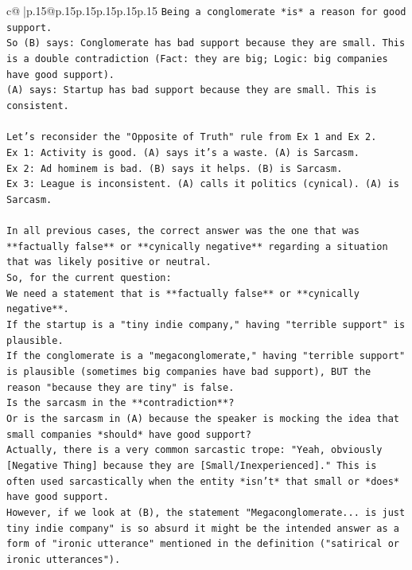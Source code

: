 \documentclass{article}
\begin{document}
{\begin{supertabular}{c@{$\;$}|p{.15\linewidth}@{}p{.15\linewidth}p{.15\linewidth}p{.15\linewidth}p{.15\linewidth}p{.15\linewidth}}
{{{\texttt{Being a conglomerate *is* a reason for good support.} \\
\texttt{So (B) says: Conglomerate has bad support because they are small. This is a double contradiction (Fact: they are big; Logic: big companies have good support).} \\
\texttt{(A) says: Startup has bad support because they are small. This is consistent.} \\
\\ 
\texttt{Let's reconsider the "Opposite of Truth" rule from Ex 1 and Ex 2.} \\
\texttt{Ex 1: Activity is good. (A) says it's a waste. (A) is Sarcasm.} \\
\texttt{Ex 2: Ad hominem is bad. (B) says it helps. (B) is Sarcasm.} \\
\texttt{Ex 3: League is inconsistent. (A) calls it politics (cynical). (A) is Sarcasm.} \\
\\ 
\texttt{In all previous cases, the correct answer was the one that was **factually false** or **cynically negative** regarding a situation that was likely positive or neutral.} \\
\texttt{So, for the current question:} \\
\texttt{We need a statement that is **factually false** or **cynically negative**.} \\
\texttt{If the startup is a "tiny indie company," having "terrible support" is plausible.} \\
\texttt{If the conglomerate is a "megaconglomerate," having "terrible support" is plausible (sometimes big companies have bad support), BUT the reason "because they are tiny" is false.} \\
\texttt{Is the sarcasm in the **contradiction**?} \\
\texttt{Or is the sarcasm in (A) because the speaker is mocking the idea that small companies *should* have good support?} \\
\texttt{Actually, there is a very common sarcastic trope: "Yeah, obviously {[}Negative Thing{]} because they are {[}Small/Inexperienced{]}." This is often used sarcastically when the entity *isn't* that small or *does* have good support.} \\
\texttt{However, if we look at (B), the statement "Megaconglomerate... is just tiny indie company" is so absurd it might be the intended answer as a form of "ironic utterance" mentioned in the definition ("satirical or ironic utterances").} \\
}}}
\end{supertabular}}
\end{document}
